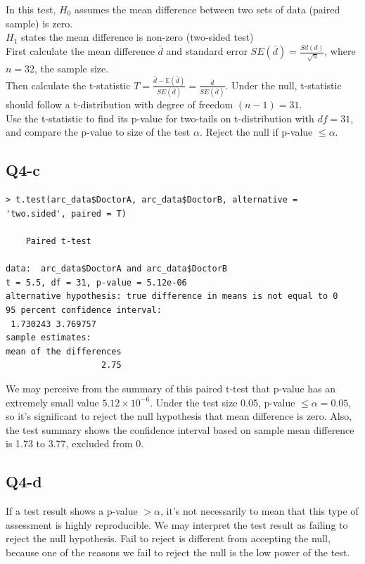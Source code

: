 \documentclass[12pt,letterpaper]{article}
\begin{document}
\noindent In this test, $H_0$ assumes the mean difference between two sets of data (paired sample) is zero. \\

\noindent $H_1$ states the mean difference is non-zero (two-sided test)\\

\noindent First calculate the mean difference $\bar{d}$ and standard error $SE(\bar{d}) = \frac{Sd(d)}{\sqrt[]{n}}$, where $n = 32$, the sample size. \\

\noindent Then calculate the t-statistic $T = \frac{\bar{d} - \mathbb{E}(\bar{d})}{SE(\bar{d})} = \frac{\bar{d}}{SE(\bar{d})}$. Under the null, t-statistic should follow a t-distribution with degree of freedom $(n - 1) = 31$. \\

\noindent Use the t-statistic to find its p-value for two-tails on t-distribution with $df = 31$, and compare the p-value to size of the test $\alpha$. Reject the null if p-value $\leq \alpha$.

\subsection*{Q4-c}
\begin{verbatim}
> t.test(arc_data$DoctorA, arc_data$DoctorB, alternative = 'two.sided', paired = T)

	Paired t-test

data:  arc_data$DoctorA and arc_data$DoctorB
t = 5.5, df = 31, p-value = 5.12e-06
alternative hypothesis: true difference in means is not equal to 0
95 percent confidence interval:
 1.730243 3.769757
sample estimates:
mean of the differences 
                   2.75 
\end{verbatim}

\noindent We may perceive from the summary of this paired t-test that p-value has an extremely small value $5.12 \times 10^{-6}$. Under the test size 0.05, p-value $\leq \alpha = 0.05$, so it's significant to reject the null hypothesis that mean difference is zero. Also, the test summary shows the confidence interval based on sample mean difference is 1.73 to 3.77, excluded from 0. 


\subsection*{Q4-d}
\noindent If a test result shows a p-value $> \alpha$, it's not necessarily to mean that this type of assessment is highly reproducible. We may interpret the test result as failing to reject the null hypothesis. Fail to reject is different from accepting the null, because one of the reasons we fail to reject the null is the low power of the test. 
\end{document}

